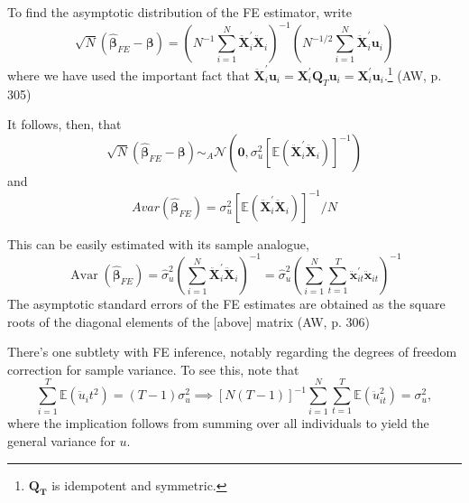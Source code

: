 \documentclass[11pt, a4paper]{report}
\theoremstyle{plain}
\theoremstyle{plain}
\theoremstyle{remark}
\begin{document}
To find the asymptotic distribution of the FE estimator, write
\begin{equation}
    \sqrt{N}\left(\hat{\boldsymbol{\beta}}_{F E}-\boldsymbol{\beta}\right)=\left(N^{-1} \sum_{i=1}^{N} \ddot{\mathbf{X}}_{i}^{\prime} \ddot{\mathbf{X}}_{i}\right)^{-1}\left(N^{-1 / 2} \sum_{i=1}^{N} \ddot{\mathbf{X}}_{i}^{\prime} \mathbf{u}_{i}\right)
\end{equation}
where we have used the important fact that $\ddot{\mathbf{X}}_{i}^{\prime} \mathbf{u}_{i}=\mathbf{X}_{i}^{\prime} \mathbf{Q}_{T} \mathbf{u}_{i}=\mathbf{X}_{i}^{\prime} \mathbf{u}_{i}$.\footnote{$\mathbf{Q_T}$ is idempotent and symmetric.} (AW, p. 305)

It follows, then, that
\begin{equation}
    \sqrt{N}\left(\hat{\boldsymbol{\beta}}_{F E}-\boldsymbol{\beta}\right) \sim_A \mathcal{N}\left(\mathbf{0}, \sigma_{u}^{2}\left[\mathbb{E}\left(\ddot{\mathbf{X}}_{i}^{\prime} \ddot{\mathbf{X}}_{i}\right)\right]^{-1}\right)
\end{equation}
and
\begin{equation}
Avar\left(\hat{\boldsymbol{\beta}}_{F E}\right)=\sigma_{u}^{2}\left[\mathbb{E}\left(\ddot{\mathbf{X}}_{i}^{\prime} \ddot{\mathbf{X}}_{i}\right)\right]^{-1} / N
\end{equation}

This can be easily estimated with its sample analogue,
\begin{equation}
    \operatorname{Avar}\left(\hat{\boldsymbol{\beta}}_{F E}\right)=\hat{\sigma}_{u}^{2}\left(\sum_{i=1}^{N} \ddot{\mathbf{X}}_{i}^{\prime} \ddot{\mathbf{X}}_{i}\right)^{-1}=\hat{\sigma}_{u}^{2}\left(\sum_{i=1}^{N} \sum_{t=1}^{T} \ddot{\mathbf{x}}_{i t}^{\prime} \ddot{\mathbf{x}}_{i t}\right)^{-1}
\end{equation}
The asymptotic standard errors of the FE estimates are obtained as the square roots
of the diagonal elements of the [above] matrix (AW, p. 306)

There's one subtlety with FE inference, notably regarding the degrees of freedom correction for sample variance. To see this, note that 
\begin{equation}
    \sum_{i=1}^T \mathbb{E}(\ddot{u}_it^2) = (T-1) \sigma_u^2 \implies [N(T-1)]^{-1} \sum_{i=1}^{N} \sum_{t=1}^{T} \mathbb{E}\left(\ddot{u}_{i t}^{2}\right)=\sigma_{u}^{2},
\end{equation}
where the implication follows from summing over all individuals to yield the general variance for $u$.
\end{document}
